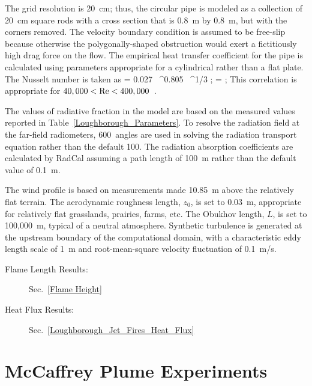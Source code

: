 The grid resolution is 20~cm; thus, the circular pipe is modeled as a collection of 20~cm square rods with a cross section that is 0.8~m by 0.8~m, but with the corners removed. The velocity boundary condition is assumed to be free-slip because otherwise the polygonally-shaped obstruction would exert a fictitiously high drag force on the flow. The empirical heat transfer coefficient for the pipe is calculated using parameters appropriate for a cylindrical rather than a flat plate. The Nusselt number is taken as
\be
   \NU = 0.027 \, \RE^{0.805} \, \PR^{1/3} \quad ; \quad \RE =  \quad ; \quad {}
\ee
This correlation is appropriate for $40,000 < \hbox{Re} < 400,000$~\cite{Incropera:1}.

The values of radiative fraction in the model are based on the measured values reported in Table~\ref{Loughborough_Parameters}. To resolve the radiation field at the far-field radiometers, 600~angles are used in solving the radiation transport equation rather than the default 100. The radiation absorption coefficients are calculated by RadCal assuming a path length of 100~m rather than the default value of 0.1~m.

The wind profile is based on measurements made 10.85~m above the relatively flat terrain. The aerodynamic roughness length, $z_0$, is set to 0.03~m, appropriate for relatively flat grasslands, prairies, farms, etc. The Obukhov length, $L$, is set to 100,000~m, typical of a neutral atmosphere. Synthetic turbulence is generated at the upstream boundary of the computational domain, with a characteristic eddy length scale of 1~m and root-mean-square velocity fluctuation of 0.1~m/s.

\begin{description}
\item[Flame Length Results:] Sec.~\ref{Flame Height}
\item[Heat Flux Results:] Sec.~\ref{Loughborough_Jet_Fires_Heat_Flux}
\end{description}


\FloatBarrier


\section{McCaffrey Plume Experiments}
\label{McCaffrey_Plume_Description}

